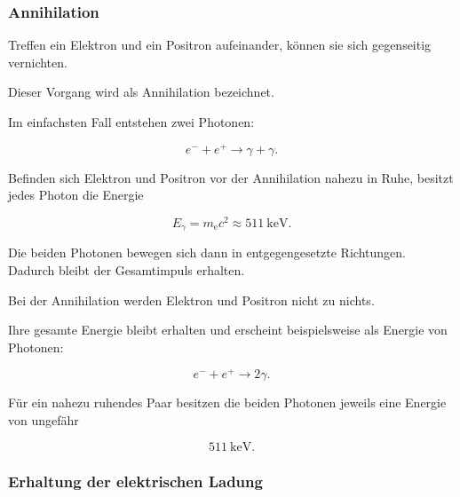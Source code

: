 \subsubsection*{Annihilation}

Treffen ein Elektron und ein Positron aufeinander, können sie sich
gegenseitig vernichten.

Dieser Vorgang wird als Annihilation%
 bezeichnet.

Im einfachsten Fall entstehen zwei Photonen:

\begin{equation}
	e^-
	+
	e^+
	\longrightarrow
	\gamma
	+
	\gamma.
	\label{eq:elektron_positron_annihilation}
\end{equation}

Befinden sich Elektron und Positron vor der Annihilation nahezu in
Ruhe, besitzt jedes Photon die Energie

\begin{equation}
	E_{\gamma}
	=
	m_{\mathrm e}c^2
	\approx
	\SI{511}{\kilo\electronvolt}.
	\label{eq:energie_annihilationsphoton}
\end{equation}

Die beiden Photonen bewegen sich dann in entgegengesetzte Richtungen.
Dadurch bleibt der Gesamtimpuls erhalten.

\begin{PhysicsBox}
	\label{box:materie_wird_zu_strahlung}
	
	Bei der Annihilation werden Elektron und Positron nicht zu nichts.
	
	Ihre gesamte Energie bleibt erhalten und erscheint beispielsweise als
	Energie von Photonen:
	
	\begin{equation}
		e^-
		+
		e^+
		\longrightarrow
		2\gamma.
	\end{equation}
	
	Für ein nahezu ruhendes Paar besitzen die beiden Photonen jeweils eine
	Energie von ungefähr
	
	\begin{equation}
		\SI{511}{\kilo\electronvolt}.
	\end{equation}
\end{PhysicsBox}

\subsubsection*{Erhaltung der elektrischen Ladung}

